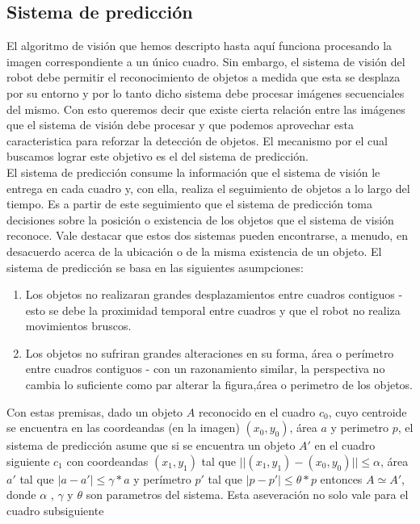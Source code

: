 	\subsection{Sistema de predicci\'on}
	El algoritmo de visión que hemos descripto hasta aquí funciona 
	procesando la imagen correspondiente a un único cuadro. Sin embargo, 
	el sistema de visión del robot debe permitir el reconocimiento de 
	objetos a medida que esta se desplaza por su entorno y por lo tanto 
	dicho sistema debe procesar imágenes secuenciales del mismo. Con 
	esto queremos decir que existe cierta relación entre las imágenes 
	que el sistema de visión debe procesar y que podemos aprovechar esta 
	caracteristica para reforzar la detección de objetos.  El mecanismo por el cual buscamos lograr este objetivo es el del sistema de predicción.\\
\indent 	El sistema de predicción consume la información que el 
sistema de visión le entrega en cada cuadro y, con ella, realiza el 
seguimiento de objetos a lo largo del tiempo. Es a partir de este 
seguimiento que el sistema de predicción toma decisiones sobre la 
posición o existencia de los objetos que el sistema de visión 
reconoce. Vale destacar que estos dos sistemas pueden encontrarse, a 
menudo, en desacuerdo acerca de la ubicación o de la misma existencia 
de un objeto.  El sistema de predicción se basa en las siguientes asumpciones:
\begin{enumerate}
\item{ Los objetos no realizaran grandes desplazamientos entre cuadros contiguos - esto se debe la proximidad temporal entre cuadros y que el robot no realiza movimientos bruscos.}
\item{ Los objetos no sufriran grandes alteraciones en su forma, área o perímetro entre cuadros contiguos - con un razonamiento similar, la perspectiva no cambia lo suficiente como par alterar la figura,área o perimetro de los objetos.}
\end{enumerate} 
Con estas premisas, dado un objeto $A$ reconocido en el cuadro $c_0$, 
cuyo centroide se encuentra en las coordeandas (en la imagen) $(x_0,y_0)$, área $a$ y perimetro $p$, 
el sistema de predicción asume que si se encuentra un objeto $A'$ en 
el cuadro siguiente $c_1$ con coordeandas $(x_1, y_1)$ tal que 
$||(x_1,y_1) - (x_0,y_0)||\leq \alpha$, área $a'$ tal que $|a-a'| \leq 
\gamma *a$ y perímetro $p'$ tal que $|p-p'|\leq \theta*p$ entonces $A 
\simeq A'$, donde $\alpha$ , $\gamma$ y $\theta$ son parametros del 
sistema. Esta aseveración no solo vale para el cuadro subsiguiente 
